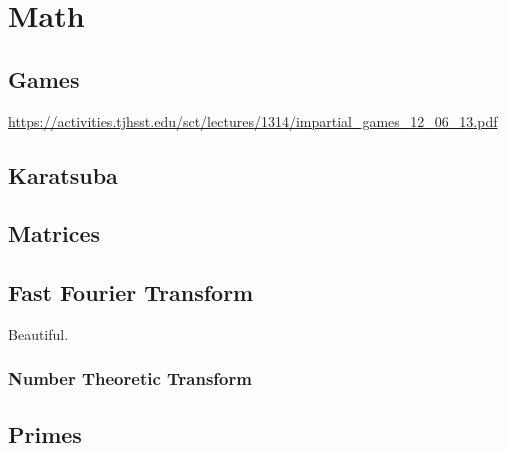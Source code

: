 \documentclass[11pt]{book}
\begin{document}
\chapter{Math}

\section{Games}

\url{https://activities.tjhsst.edu/sct/lectures/1314/impartial_games_12_06_13.pdf}

\section{Karatsuba}

\section{Matrices}

\section{Fast Fourier Transform}

Beautiful.

\subsection{Number Theoretic Transform}

\section{Primes}

\appendix

\listofalgorithms
\end{document}
